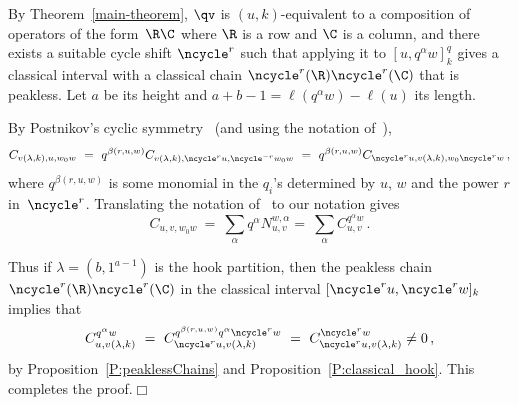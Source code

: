 By Theorem~\ref{main-theorem}, $\qv$ is $(u,k)$-equivalent to a composition of operators of the form~$\R\C$ where $\R$ is a row and $\C$ is a column, and there exists a
suitable cycle shift $\ncycle^r$ such that applying it to  $[u,q^\alpha w]^q_k$ gives a classical interval with
a classical chain $\ncycle^r(\R)\ncycle^r(\C)$ that is peakless.
Let $a$ be its height and $a+b-1=\ell(q^\alpha w)-\ell(u)$ its length.
 
By Postnikov's cyclic symmetry~\cite[Thm.~4]{Postnikov_symmetry} (and using the notation of~\cite{Postnikov_symmetry}),
\[
   C_{v(\lambda,k),u,w_0w}\ =\ q^{\beta(r,u,w)}C_{v(\lambda,k),\ncycle^{r} u,\ncycle^{-r}w_0w}\ =\ 
   q^{\beta(r,u,w)}C_{\ncycle^{r} u,v(\lambda,k),w_0\ncycle^{r}w}\,,
\]
where $q^{\beta(r,u,w)}$ is some monomial in the $q_i$'s determined by $u$, $w$ and the power $r$ in~$\ncycle^r$.
Translating the notation of~\cite{Postnikov_symmetry} to our notation gives
\[
C_{u,v,w_0w}\ =\ \sum_\alpha q^\alpha N_{u,v}^{w,\alpha}=\ \sum_\alpha C_{u,v}^{q^\alpha w} \,.
\]

Thus if $\lambda=(b,1^{a-1})$ is the hook partition, then the peakless chain $\ncycle^r(\R)\ncycle^r(\C)$ in the classical interval 
$[\ncycle^{r} u,\ncycle^{r}w]_k$ implies that
\[
   C_{u,v(\lambda,k)}^{q^\alpha w}\ =\ C_{\ncycle^{r} u,v(\lambda,k)}^{ q^{\beta(r,u,w)}q^\alpha \ncycle^{r}w}\ =\
   C_{\ncycle^{r} u,v(\lambda,k)}^{ \ncycle^{r}w} \ne 0\,,
\]
by Proposition~\ref{P:peaklessChains} and Proposition~\ref{P:classical_hook}.
This completes the proof.\hfill$\Box$
